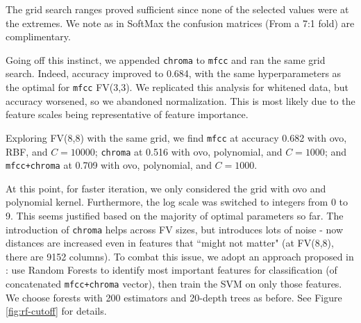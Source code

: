 \documentclass{article}
\begin{document}
The grid search ranges proved sufficient since none of the selected values were at the extremes. We note as in SoftMax the confusion matrices (From a 7:1 fold) are complimentary.

Going off this instinct, we appended \texttt{chroma} to \texttt{mfcc} and ran the same grid search. Indeed, accuracy improved to 0.684, with the same hyperparameters as the optimal for \texttt{mfcc} FV(3,3). We replicated this analysis for whitened data, but accuracy worsened, so we abandoned normalization. This is most likely due to the feature scales being representative of feature importance.

Exploring FV(8,8) with the same grid, we find \texttt{mfcc} at accuracy 0.682 with ovo, RBF, and $C=10000$; \texttt{chroma} at 0.516 with ovo, polynomial, and $C=1000$; and \texttt{mfcc+chroma} at 0.709 with ovo, polynomial, and $C=1000$.

At this point, for faster iteration, we only considered the grid with ovo and polynomial kernel. Furthermore, the log scale was switched to integers from 0 to 9. This seems justified based on the majority of optimal parameters so far. The introduction of \texttt{chroma} helps across FV sizes, but introduces lots of noise - now distances are increased even in features that ``might not matter" (at FV(8,8), there are 9152 columns). To combat this issue, we adopt an approach proposed in \cite{vox}: use Random Forests to identify most important features for classification (of concatenated \texttt{mfcc+chroma} vector), then train the SVM on only those features. We choose forests with 200 estimators and 20-depth trees as before. See Figure \ref{fig:rf-cutoff} for details.
\end{document}

